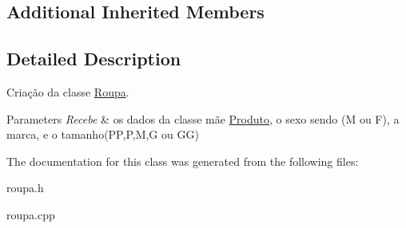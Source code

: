 \subsection*{Additional Inherited Members}


\subsection{Detailed Description}
Criação da classe \mbox{\hyperlink{classRoupa}{Roupa}}. 


\begin{DoxyParams}{Parameters}
{\em Recebe} & os dados da classe mãe \mbox{\hyperlink{classProduto}{Produto}}, o sexo sendo (M ou F), a marca, e o tamanho(\+P\+P,\+P,\+M,\+G ou G\+G) \\
\hline
\end{DoxyParams}


The documentation for this class was generated from the following files\+:\begin{DoxyCompactItemize}
\item 
roupa.\+h\item 
roupa.\+cpp\end{DoxyCompactItemize}

